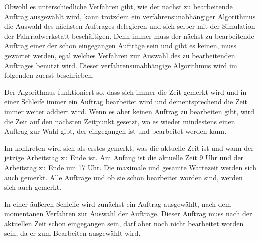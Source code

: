 \documentclass[a4paper,10pt,ngerman]{scrartcl}
\begin{document}
Obwohl es unterschiedliche Verfahren gibt, wie der nächst zu bearbeitende Auftrag ausgewählt wird,
kann trotzdem ein verfahrensunabhängiger Algorithmus die Auswahl des nächsten Auftrages delegieren
und sich selber mit der Simulation der Fahrradwerkstatt beschäftigen.
Denn immer muss der nächst zu bearbeitende Auftrag
einer der schon eingegangen Aufträge sein und gibt es keinen, muss gewartet werden,
egal welches Verfahren zur Auswahl des zu bearbeitenden Auftrages benutzt wird.
Dieser verfahrensunabhängige Algorithmus wird im folgenden zuerst beschrieben.

Der Algorithmus funktioniert so,
dass sich immer die Zeit gemerkt wird
und in einer Schleife immer ein Auftrag bearbeitet wird
und dementsprechend die Zeit immer weiter addiert wird.
Wenn es aber keinen Auftrag zu bearbeiten gibt,
wird die Zeit auf den nächsten Zeitpunkt gesetzt,
wo es wieder mindestens einen Auftrag zur Wahl gibt,
der eingegangen ist und bearbeitet werden kann.

Im konkreten wird sich als erstes gemerkt, was die aktuelle Zeit ist und wann der jetzige Arbeitstag zu Ende ist.
Am Anfang ist die aktuelle Zeit 9 Uhr und der Arbeitstag zu Ende um 17 Uhr.
Die maximale und gesamte Wartezeit werden sich auch gemerkt.
Alle Aufträge und ob sie schon bearbeitet worden sind, werden sich auch gemerkt.

In einer äußeren Schleife wird zunächst ein Auftrag ausgewählt,
nach dem momentanen Verfahren zur Auswahl der Aufträge.
Dieser Auftrag muss nach der aktuellen Zeit schon eingegangen sein,
darf aber noch nicht bearbeitet worden sein, da er zum Bearbeiten ausgewählt wird.
\end{document}

